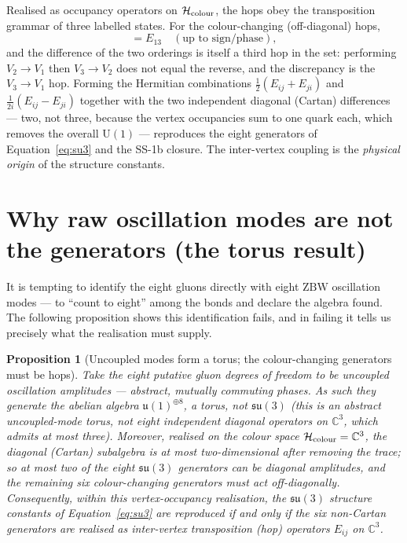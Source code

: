 \documentclass[11pt,a4paper]{article}
\newtheorem{proposition}[theorem]{Proposition}
\newcommand{\ZBW}{\mathrm{ZBW}}
\begin{document}
Realised as occupancy operators on $\mathcal{H}_{\rm colour}$, the hops obey the
transposition grammar of three labelled states. For the colour-changing
(off-diagonal) hops,
\begin{equation}
[E_{12},\,E_{23}] = E_{13}\quad(\text{up to sign/phase}),
\label{eq:closure}
\end{equation}
and the difference of the two orderings is itself a third hop in the set:
performing $V_2\!\to\!V_1$ then $V_3\!\to\!V_2$ does not equal the reverse, and
the discrepancy is the $V_3\!\to\!V_1$ hop. Forming the Hermitian combinations
$\tfrac{1}{2}(E_{ij}+E_{ji})$ and $\tfrac{1}{2i}(E_{ij}-E_{ji})$ together with
the two independent diagonal (Cartan) differences --- two, not three, because
the vertex occupancies sum to one quark each, which removes the overall
$\mathrm{U}(1)$ --- reproduces the eight generators of
Equation~\eqref{eq:su3} and the SS-1b closure. The inter-vertex coupling is
the \emph{physical origin} of the structure constants.

\section{Why raw oscillation modes are not the generators (the torus result)}
\label{sec:torus}

It is tempting to identify the eight gluons directly with eight $\ZBW$
oscillation modes --- to ``count to eight'' among the bonds and declare the
algebra found. The following proposition shows this identification fails, and in
failing it tells us precisely what the realisation must supply.

\begin{proposition}[Uncoupled modes form a torus; the colour-changing generators must be hops]
\label{prop:torus}
Take the eight putative gluon degrees of freedom to be uncoupled oscillation
amplitudes --- abstract, mutually commuting phases. As such they generate the
abelian algebra $\mathfrak{u}(1)^{\oplus 8}$, a torus, not $\mathfrak{su}(3)$
(this is an abstract uncoupled-mode torus, \emph{not} eight independent diagonal
operators on $\mathbb{C}^3$, which admits at most three).
Moreover, realised \emph{on the colour space} $\mathcal{H}_{\rm
colour}=\mathbb{C}^3$, the diagonal (Cartan) subalgebra is at most
two-dimensional after removing the trace; so at most two of the eight
$\mathfrak{su}(3)$ generators can be diagonal amplitudes, and the remaining six
colour-changing generators \emph{must} act off-diagonally. Consequently, within
this vertex-occupancy realisation, the $\mathfrak{su}(3)$ structure constants of
Equation~\eqref{eq:su3} are reproduced if and only if the six non-Cartan
generators are realised as inter-vertex transposition (hop) operators $E_{ij}$
on $\mathbb{C}^3$.
\end{proposition}
\end{document}
